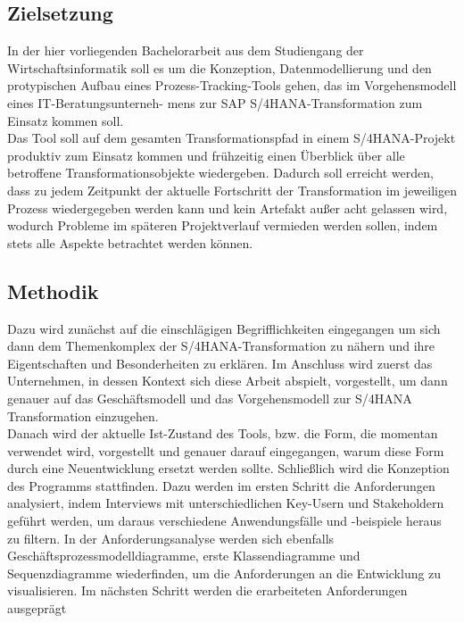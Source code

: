 \subsection{Zielsetzung}
In der hier vorliegenden Bachelorarbeit aus dem Studiengang der Wirtschaftsinformatik soll es um die Konzeption, Datenmodellierung und den protypischen Aufbau eines Prozess-Tracking-Tools gehen, das im Vorgehensmodell eines IT-Beratungsunterneh- mens zur SAP S/4HANA-Transformation zum Einsatz kommen soll.\\ 
Das Tool soll auf dem gesamten Transformationspfad in einem S/4HANA-Projekt produktiv zum Einsatz kommen und frühzeitig einen 
Überblick über alle betroffene Transformationsobjekte wiedergeben. 
Dadurch soll erreicht werden, dass zu jedem Zeitpunkt der aktuelle Fortschritt der Transformation im jeweiligen Prozess wiedergegeben werden kann und kein Artefakt außer acht gelassen wird, wodurch Probleme im späteren Projektverlauf vermieden werden sollen, indem stets alle Aspekte betrachtet werden können.

\subsection{Methodik}
Dazu wird zunächst auf die einschlägigen Begrifflichkeiten eingegangen um sich dann dem Themenkomplex der S/4HANA-Transformation zu nähern und ihre Eigentschaften und Besonderheiten zu erklären. Im Anschluss wird zuerst das Unternehmen, in dessen Kontext sich diese Arbeit abspielt, vorgestellt, um dann genauer auf das Geschäftsmodell und das Vorgehensmodell zur S/4HANA Transformation einzugehen. \\
Danach wird der aktuelle Ist-Zustand des Tools, bzw. die Form, die momentan verwendet wird, vorgestellt und genauer darauf eingegangen, warum diese Form durch eine Neuentwicklung ersetzt werden sollte. Schließlich wird die Konzeption des Programms stattfinden. Dazu werden im ersten Schritt die Anforderungen analysiert, indem Interviews mit unterschiedlichen Key-Usern und Stakeholdern geführt werden, um daraus verschiedene Anwendungsfälle und -beispiele heraus zu filtern. In der Anforderungsanalyse werden sich ebenfalls Geschäftsprozessmodelldiagramme, erste Klassendiagramme und Sequenzdiagramme wiederfinden, um die Anforderungen an die Entwicklung zu visualisieren. Im nächsten Schritt werden die erarbeiteten Anforderungen ausgeprägt
